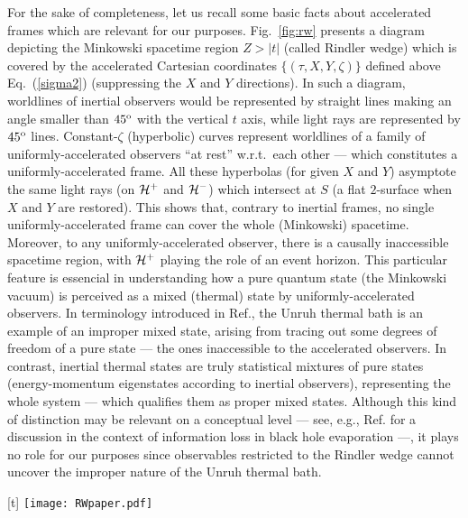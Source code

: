 \documentclass[]{nature}
\makeatletter
\renewenvironment{figure}
               {\@float{figure}}
               {\end@float}
\makeatother
\begin{document}
{For the sake of completeness, let us recall some basic facts about accelerated frames which are relevant for our purposes. Fig.~\ref{fig:rw} presents a diagram 
depicting the Minkowski spacetime region  $Z>|t|$ (called  Rindler wedge) which is covered by the accelerated Cartesian coordinates $\{(\tau,X,Y,\zeta)\}$
defined above  Eq.~(\ref{sigma2}) (suppressing
the $X$ and $Y$ directions). In such a diagram, worldlines of inertial observers would be represented by straight lines making an angle smaller than $45^{\rm o}$ with the vertical
$t$ axis, while light rays are represented by $45^{\rm o}$ lines. Constant-$\zeta$ (hyperbolic) 
curves represent worldlines of a family of uniformly-accelerated observers ``at rest'' w.r.t.\ each other --- which constitutes a uniformly-accelerated frame. 
All these hyperbolas (for given $X$ and $Y$) asymptote the same light rays (on ${\cal H}^+$ and ${\cal H}^-$) 
which intersect at $S$  (a flat $2$-surface
when  $X$ and $Y$ are restored). This shows that, contrary to inertial frames, no single  uniformly-accelerated frame can cover the whole (Minkowski)  spacetime. Moreover, to any 
uniformly-accelerated observer,
there is a causally inaccessible spacetime region, with ${\cal H}^+$ playing the role of an  event horizon.  This particular feature is essencial
in understanding how a pure quantum state (the Minkowski vacuum) is perceived  as a  mixed (thermal) state by uniformly-accelerated observers. In terminology introduced in Ref.\cite{Espagnat}, the Unruh thermal bath
is an example of an  improper  mixed state, arising from tracing out some degrees of freedom 
of a pure state --- the ones inaccessible to the accelerated observers. In contrast, inertial thermal states are
truly statistical  mixtures of pure states (energy-momentum eigenstates according to inertial observers), 
representing the whole system ---
which qualifies them as  proper
mixed states. Although this  kind of distinction may be relevant  on a conceptual level
--- see, e.g., Ref.\cite{MOPS} for a discussion in the context of information loss
in black hole evaporation ---,
it plays no role for our purposes since observables restricted to the Rindler wedge cannot 
uncover the improper nature of the Unruh thermal bath.

\begin{figure}[t]
\texttt{[image: RWpaper.pdf]}
\caption{Uniformly accelerated frame and the Rindler wedge. Depiction of the Minkowski spacetime region $Z > |t|$ covered by the coordinates $\tau$ and $\zeta$ (suppressing coordinates $X$ and $Y$). 
This is commonly referred to as the  Rindler wedge. Solid (blue)  curves represent the ($\zeta = $~constant) worldlines of uniformly-accelerated observers 
``at rest'' w.r.t.\ each other, while
dashed (black) lines represent $\tau =$~constant hypersurfaces --- which encodes simultaneity according to
these observers. All constant-$\zeta$ curves asymptote ${\cal H}^+$ and ${\cal H}^-$, reflecting  that 
this uniformly-accelerated frame does not cover the whole spacetime. Moreover, there is a spacetime region which is
causally
inaccessible to observers in this frame, for whom ${\cal H}^+$ represents a (future) event horizon.}
\label{fig:rw}
\end{figure}



}
\end{document}
